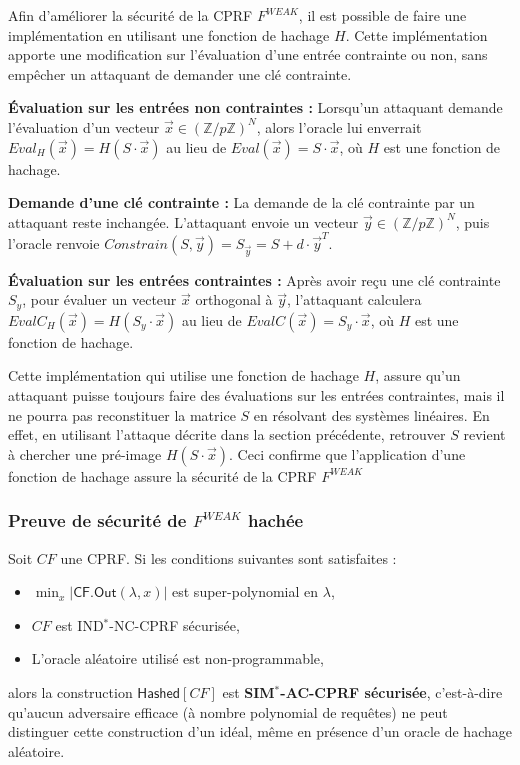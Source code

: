 \documentclass[9pt]{extarticle}
\begin{document}
Afin d'améliorer la sécurité de la CPRF $F^{WEAK}$, il est possible de faire une implémentation en utilisant une fonction de hachage $H$. Cette implémentation apporte une modification sur l'évaluation d'une entrée contrainte ou non, sans empêcher un attaquant de demander une clé contrainte.

\textbf{\'{E}valuation sur les entrées non contraintes : }Lorsqu'un attaquant demande l'évaluation d'un vecteur $\vec{x} \in (\mathbb{Z}/p\mathbb{Z})^N$, alors l'oracle lui enverrait $Eval_H(\vec{x}) = H(S \cdot \vec{x})$ au lieu de $Eval(\vec{x}) = S \cdot \vec{x}$, où $H$ est une fonction de hachage.

\textbf{Demande d'une clé contrainte : }La demande de la clé contrainte par un attaquant reste inchangée. L'attaquant envoie un vecteur $\vec{y} \in (\mathbb{Z}/p\mathbb{Z})^N$, puis l'oracle renvoie $Constrain(S, \vec{y}) = S_{\vec{y}} = S + d \cdot \vec{y}^T$.

\textbf{\'{E}valuation sur les entrées contraintes : }Après avoir reçu une clé contrainte $S_y$, pour évaluer un vecteur $\vec{x}$ orthogonal à $\vec{y}$, l'attaquant calculera $EvalC_H(\vec{x}) = H(S_y \cdot \vec{x})$ au lieu de $EvalC(\vec{x}) = S_y \cdot \vec{x}$, où $H$ est une fonction de hachage.

Cette implémentation qui utilise une fonction de hachage $H$, assure qu'un attaquant puisse toujours faire des évaluations sur les entrées contraintes, mais il ne pourra pas reconstituer la matrice $S$ en résolvant des systèmes linéaires. En effet, en utilisant l'attaque décrite dans la section précédente, retrouver $S$ revient à chercher une pré-image $H(S \cdot \vec{x})$. Ceci confirme que l'application d'une fonction de hachage assure la sécurité de la CPRF $F^{WEAK}$


\subsubsection{Preuve de sécurité de $F^{WEAK}$ hachée}


\begin{defbox}{}
Soit $CF$ une CPRF. Si les conditions suivantes sont satisfaites :
\begin{itemize}
    \item $\min_x |\textsf{CF.Out}(\lambda, x)|$ est super-polynomial en $\lambda$,
    \item $CF$ est IND$^*$-NC-CPRF sécurisée,
    \item L'oracle aléatoire utilisé est non-programmable,
\end{itemize}
alors la construction $\textsf{Hashed}[CF]$ est \textbf{SIM$^*$-AC-CPRF sécurisée},
c’est-à-dire qu’aucun adversaire efficace (à nombre polynomial de requêtes)
ne peut distinguer cette construction d’un idéal, même en présence d’un oracle de hachage aléatoire.
\end{defbox}
\end{document}
